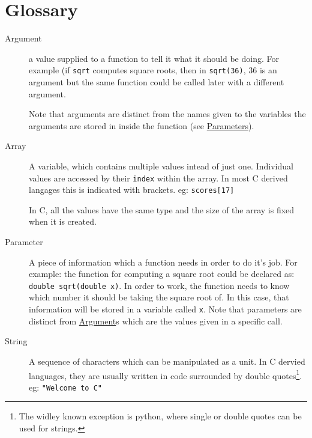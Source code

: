 
\chapter*{Glossary}

\begin{description}
 \item[\hypertarget{defn:argument}{Argument}] a value supplied to a function to tell it what it should be doing.
 For example (if \texttt{sqrt} computes square roots, then in \lstinline{sqrt(36)}, $36$ is an argument but the same function
 could be called later with a different argument.
 
 Note that arguments are distinct from the names given to the variables the arguments are stored in inside the function (see \hyperlink{defn:parameter}{Parameters}).
 \item[\hypertarget{defn:array}{Array}] A variable, which contains multiple values intead of just one. 
 Individual values are accessed by their \texttt{index} within the array.
 In most C derived langages this is indicated with brackets.
 eg:
    \lstinline!scores[17]!
    
 In C, all the values have the same type and the size of the array is fixed 
 when it is created.
 
 \item[\hypertarget{defn:parameter}{Parameter}] A piece of information which a function needs in order to do it's job.
 For example: the function for computing a square root could be declared as:
 \lstinline!double sqrt(double x)!.
 In order to work, the function needs to know which number it should be taking the square root of.
 In this case, that information will be stored in a variable called \texttt{x}.
 Note that parameters are distinct from \hyperlink{defn:argument}{Argument}s which are the values given in a specific call.
 
 \item[\hypertarget{defn:string}{String}] A sequence of characters which can be manipulated as a unit.
 In C dervied languages, they are usually written in code surrounded by double quotes\footnote{The widley known exception 
 is python, where single or double quotes can be used for strings.}.
 eg:
 \lstinline!"Welcome to C"!
\end{description}
